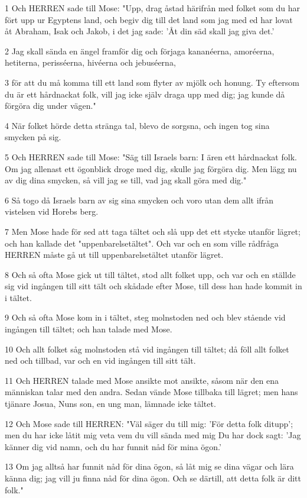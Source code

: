 \par 1 Och HERREN sade till Mose: "Upp, drag åstad härifrån med folket som du har fört upp ur Egyptens land, och begiv dig till det land som jag med ed har lovat åt Abraham, Isak och Jakob, i det jag sade: 'Åt din säd skall jag giva det.'
\par 2 Jag skall sända en ängel framför dig och förjaga kananéerna, amoréerna, hetiterna, perisséerna, hivéerna och jebuséerna,
\par 3 för att du må komma till ett land som flyter av mjölk och honung. Ty eftersom du är ett hårdnackat folk, vill jag icke själv draga upp med dig; jag kunde då förgöra dig under vägen."
\par 4 När folket hörde detta stränga tal, blevo de sorgsna, och ingen tog sina smycken på sig.
\par 5 Och HERREN sade till Mose: "Säg till Israels barn: I ären ett hårdnackat folk. Om jag allenast ett ögonblick droge med dig, skulle jag förgöra dig. Men lägg nu av dig dina smycken, så vill jag se till, vad jag skall göra med dig."
\par 6 Så togo då Israels barn av sig sina smycken och voro utan dem allt ifrån vistelsen vid Horebs berg.
\par 7 Men Mose hade för sed att taga tältet och slå upp det ett stycke utanför lägret; och han kallade det "uppenbarelsetältet". Och var och en som ville rådfråga HERREN måste gå ut till uppenbarelsetältet utanför lägret.
\par 8 Och så ofta Mose gick ut till tältet, stod allt folket upp, och var och en ställde sig vid ingången till sitt tält och skådade efter Mose, till dess han hade kommit in i tältet.
\par 9 Och så ofta Mose kom in i tältet, steg molnstoden ned och blev stående vid ingången till tältet; och han talade med Mose.
\par 10 Och allt folket såg molnstoden stå vid ingången till tältet; då föll allt folket ned och tillbad, var och en vid ingången till sitt tält.
\par 11 Och HERREN talade med Mose ansikte mot ansikte, såsom när den ena människan talar med den andra. Sedan vände Mose tillbaka till lägret; men hans tjänare Josua, Nuns son, en ung man, lämnade icke tältet.
\par 12 Och Mose sade till HERREN: "Väl säger du till mig: 'För detta folk ditupp'; men du har icke låtit mig veta vem du vill sända med mig Du har dock sagt: 'Jag känner dig vid namn, och du har funnit nåd för mina ögon.'
\par 13 Om jag alltså har funnit nåd för dina ögon, så låt mig se dina vägar och lära känna dig; jag vill ju finna nåd för dina ögon. Och se därtill, att detta folk är ditt folk."
